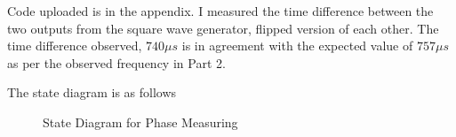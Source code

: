 
Code uploaded is in the appendix. I measured the time difference between the two
outputs from the square wave generator, flipped version of each other. The time
difference observed, \textbf{$740 \mu s$} is in agreement with the expected
value of $757 \mu s$ as per the observed frequency in Part 2.

The state diagram is as follows

\begin{figure}[ht]
  \centering
  \caption{State Diagram for Phase Measuring}
  \label{fig:p3sd}
\end{figure}